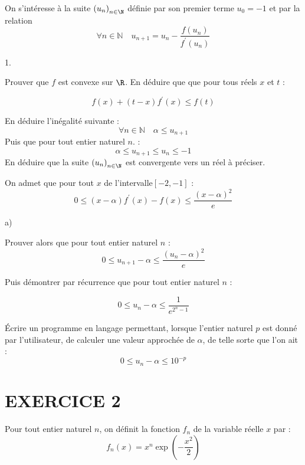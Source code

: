 \documentclass[11pt]{article}%
\begin{document}
On s'intéresse à la suite $\left( u_{n}\right)_{n\in \N}$ définie par
son premier terme $u_{0} = -1$ et par la relation 
\[
\forall n\in \mathbb{N\quad }u_{n + 1} = u_{n}-\frac{f\left(
u_{n}\right) }{f^{\prime }\left( u_{n}\right) }
\]

\begin{noliste}{1.}
 \setlength{\itemsep}{4mm}
\item Prouver que $f$ est convexe sur $\R$. En déduire que que pour
tous réels $x$ et $t$ :

\[
f\left( x\right) + \left( t-x\right) f^{\prime }\left( x\right) \leq
f\left( t\right)
\]

\item En déduire l'inégalité suivante : 
\[
\forall n\in \mathbb{N\quad \alpha }\leq u_{n + 1}
\]
Puis que pour tout entier naturel $n$. : 
\[
\alpha \leq u_{n + 1}\leq u_{n}\leq -1
\]
En déduire que la suite $\left( u_{n}\right)_{n\in \N}$ est convergente
vers un réel à préciser.

\item On admet que pour tout $x$ de l'intervalle$\left[ -2,-1\right]$ :
\[
0\leq \left( x-\alpha \right) f^{\prime }\left( x\right) -f\left(
x\right) \leq \frac{\left( x-\alpha \right) ^{2}}{e}
\]

\begin{noliste}{a)}
 \setlength{\itemsep}{2mm}
\item Prouver alors que pour tout entier naturel $n$ : 
\[
0\leq u_{n + 1}-\alpha \leq \frac{\left( u_{n}-\alpha \right) ^{2}}{e}
\]

\item Puis démontrer par récurrence que pour tout entier naturel $n$ :

\[
0\leq u_{n}-\alpha \leq \frac{1}{e^{2^{n}-1}}
\]
\end{noliste}

\item Écrire un programme en langage \Scilab{} permettant, lorsque
l'entier
naturel $p$ est donné par l'utilisateur, de calculer une valeur
approchée de 
$\alpha $, de telle sorte que l'on ait : 
\[
0\leq u_{n}-\alpha \leq 10^{-p}
\]
\end{noliste}

\section*{EXERCICE 2}

Pour tout entier naturel $n$, on définit la fonction $f_{n}$ de la
variable réelle $x$ par : 
\[
f_{n}\left( x\right) = x^{n}\exp \left( -\frac{x^{2}}{2}\right)
\]
\end{document}
